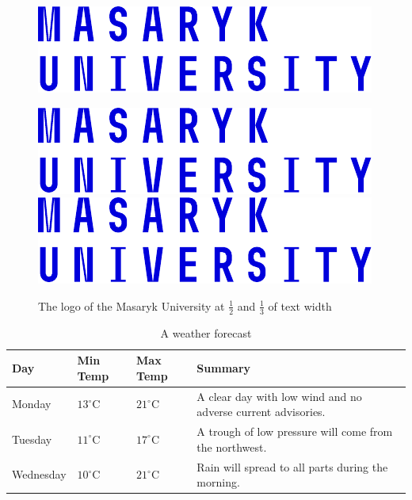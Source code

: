 \documentclass[
  digital,     %
  oneside,     %
  nosansbold,  %
  nocolorbold, %
  lof,         %
  lot,         %
]{fithesis4}
\begin{document}
\begin{figure}
  \begin{center}
    \begin{minipage}{.5\textwidth}
      \includegraphics[width=\textwidth]{fithesis/logo/mu/fithesis-base-english-color}
    \end{minipage}
    \hfill  %
    \begin{minipage}{.33\textwidth}
      \includegraphics[width=\textwidth]{fithesis/logo/mu/fithesis-base-english-color} \\[1em]
      \includegraphics[width=\textwidth]{fithesis/logo/mu/fithesis-base-english-color}
    \end{minipage}
  \end{center}
\caption{The logo of the Masaryk University at $\frac12$ and
    $\frac13$ of text width}
  \label{fig:mulogo2}
\end{figure}

\begin{table}
  \begin{tabularx}{\textwidth}{lllX}
    \toprule
    Day & Min Temp & Max Temp & Summary \\
    \midrule
    Monday & $13^{\circ}\mathrm{C}$ & $21^\circ\mathrm{C}$ & A
    clear day with low wind and no adverse current advisories. \\
    Tuesday & $11^{\circ}\mathrm{C}$ & $17^\circ\mathrm{C}$ & A
    trough of low pressure will come from the northwest. \\
    Wednesday & $10^{\circ}\mathrm{C}$ &
    $21^\circ\mathrm{C}$ & Rain will spread to all parts during the
    morning. \\
    \bottomrule
  \end{tabularx}
  \caption{A weather forecast}
  \label{tab:weather}
\end{table}
\end{document}
